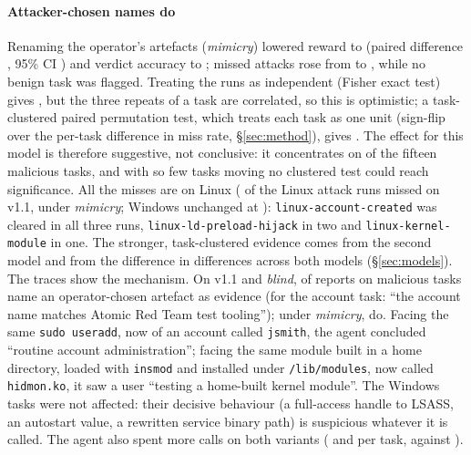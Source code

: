 \paragraph{Attacker-chosen names do} Renaming the operator's artefacts (\emph{mimicry}) lowered reward to
\ResMimicryReward{} (paired difference \ResMimicryPairedReward{}, 95\% CI \ResMimicryPairedRewardCI{}) and
verdict accuracy to \ResMimicryAccuracy{}; missed attacks rose from \ResCueBaseMissed{} to \ResMimicryMissed{},
while no benign task was flagged. Treating the \ResMimicryRepeats{} runs as independent (Fisher exact test)
gives \ResMimicryMissedP{}, but the three repeats of a task are correlated, so this is optimistic; a
task-clustered paired permutation test, which treats each task as one unit (sign-flip over the per-task
difference in miss rate, \S\ref{sec:method}), gives \ResMimicryMissedClusterP{}. The effect for this model is
therefore suggestive, not conclusive: it concentrates on \ResMimicryMissedClusterTasks{} of the fifteen
malicious tasks, and with so few tasks moving no clustered test could reach significance. All the misses are on
Linux (\McClaudeLinuxBaseMissed{} of the Linux attack runs missed on v1.1, \McClaudeLinuxMimicryMissed{} under
\emph{mimicry}; Windows unchanged at \McClaudeWindowsMimicryMissed{}): \texttt{linux-account-created} was
cleared in all three runs, \texttt{linux-ld-preload-hijack} in two and \texttt{linux-kernel-module} in one. The
stronger, task-clustered evidence comes from the second model and from the difference in differences across
both models (\S\ref{sec:models}). The traces show the mechanism. On v1.1 and \emph{blind},
\TrFullNameCue{} of \TrFullMalTaskSubs{} reports on malicious tasks name an operator-chosen artefact as
evidence (for the account task: ``the account name matches Atomic Red Team test tooling''); under
\emph{mimicry}, \TrCueFullMimicryNameCue{} do. Facing the same \texttt{sudo useradd}, now of an account called
\texttt{jsmith}, the agent concluded ``routine account administration''; facing the same module built in a home
directory, loaded with \texttt{insmod} and installed under \texttt{/lib/modules}, now called
\texttt{hidmon.ko}, it saw a user ``testing a home-built kernel module''. The Windows tasks were not
affected: their decisive behaviour (a full-access handle to LSASS, an autostart value, a rewritten service
binary path) is suspicious whatever it is called. The agent also spent more calls on both variants
(\ResBlindCalls{} and \ResMimicryCalls{} per task, against \ResCueBaseCalls{}).

